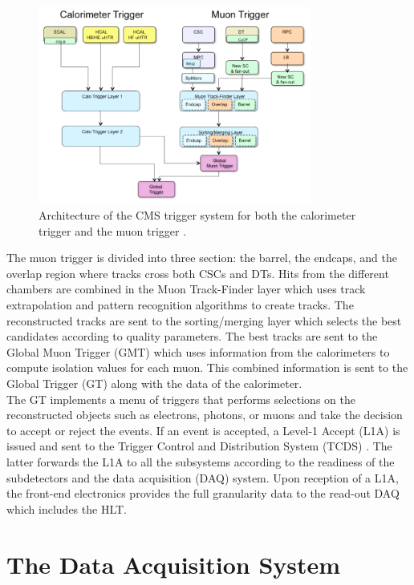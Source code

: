     \begin{figure}[h!]
      \centering
      \includegraphics[width=0.8\textwidth]{img/I-3-cms/l1.png}
      \caption{Architecture of the CMS trigger system for both the calorimeter trigger and the muon trigger \cite{1748-0221-3-08-S08004}.}
      \label{fig:I-3-l1}
    \end{figure}

    The muon trigger is divided into three section: the barrel, the endcaps, and the overlap region where tracks cross both CSCs and DTs. Hits from the different chambers are combined in the Muon Track-Finder layer which uses track extrapolation and pattern recognition algorithms to create tracks. The reconstructed tracks are sent to the sorting/merging layer which selects the best candidates according to quality parameters. The best tracks are sent to the Global Muon Trigger (GMT) which uses information from the calorimeters to compute isolation values for each muon. This combined information is sent to the Global Trigger (GT) along with the data of the calorimeter. \\

    The GT implements a menu of triggers that performs selections on the reconstructed objects such as electrons, photons, or muons and take the decision to accept or reject the events. If an event is accepted, a Level-1 Accept (L1A) is issued and sent to the Trigger Control and Distribution System (TCDS) \cite{1748-0221-9-08-C08002}. The latter forwards the L1A to all the subsystems according to the readiness of the subdetectors and the data acquisition (DAQ) system. Upon reception of a L1A, the front-end electronics provides the full granularity data to the read-out DAQ which includes the HLT.

  \section{The Data Acquisition System}
  \label{sec:I-3-daq}

